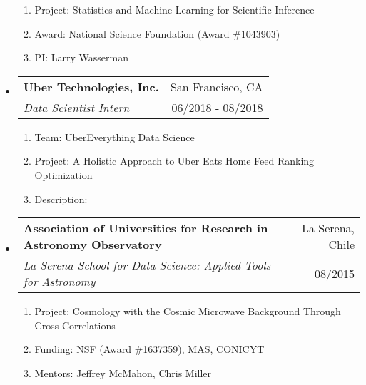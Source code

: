 \documentclass[letterpaper,10pt]{article}
\makeatletter
\newcommand{\subheadingtwo}[4]{
\begin{tabular*}{6.5in}{l@{\cftdotfill{\cftsecdotsep}\extracolsep{\fill}}r}
\textbf{#1} & #2 \\
#3 & {#4} \\
\end{tabular*}}
\makeatother
\begin{document}
\begin{itemize}[leftmargin=0.4cm]
\begin{enumerate}[leftmargin=0.5cm]
	\setlength\itemsep{-0.05ex}
	\item[] Project: Statistics and Machine Learning for Scientific Inference
	\item[] Award: National Science Foundation (\href{https://www.nsf.gov/awardsearch/showAward?AWD_ID=1043903&HistoricalAwards=false}{Award \#1043903})
	\item[] PI: Larry Wasserman
\end{enumerate}


\vspace{0.1cm}


\item[] \subheadingtwo{Uber Technologies, Inc.}{San Francisco, CA}{\it Data Scientist Intern}{06/2018 - 08/2018}


\begin{enumerate}[leftmargin=0.5cm]
	\setlength\itemsep{-0.05ex}
	\item[] Team: UberEverything Data Science
	\item[] Project: A Holistic Approach to Uber Eats Home Feed Ranking Optimization
	\item[] Description:
\vspace{-0.1cm}
{}
\end{enumerate}


\vspace{0.1cm}


\item[] \subheadingtwo{Association of Universities for Research in Astronomy Observatory}{La Serena, Chile}{\it La Serena School for Data Science: Applied Tools for Astronomy}{08/2015}

\begin{enumerate}[leftmargin=0.5cm]
	\setlength\itemsep{-0.05ex}
	\item[] Project: Cosmology with the Cosmic Microwave Background Through Cross Correlations
	\item[] Funding: NSF (\href{https://www.nsf.gov/awardsearch/showAward?AWD_ID=1637359&HistoricalAwards=false}{Award \#1637359}), MAS, CONICYT
	\item[] Mentors: Jeffrey McMahon, Chris Miller
\end{enumerate}



\end{itemize}
\end{document}
